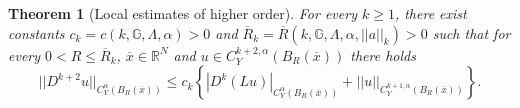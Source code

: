 \documentclass{article}
\newtheorem{theorem}{Theorem}[section]
\numberwithin{equation}{section}
\begin{document}


\vspace{2mm}

\begin{theorem}[Local estimates of higher order]
\label{local est high order der thm}
    For every $k \geq 1$, there exist constants $c_k=c(k,\mathbb{G}, \Lambda, \alpha)>0$ and $\overline{R}_k=\overline{R}(k,\mathbb{G}, \Lambda, \alpha, ||a||_k)>0$ such that for every $0 < R \leq \overline{R}_k$, $\overline{x} \in \mathbb{R}^N$ and $u \in C^{k+2,\alpha}_{Y}(B_R(\overline{x}))$ there holds
    \begin{equation*}
        ||D^{k+2}u||_{C^{\alpha}_Y(B_R(\overline{x}))} \leq c_k \left\{|D^k( Lu)|_{C^{\alpha}_Y(B_R(\overline{x}))} + ||u||_{C^{k+1,\alpha}_Y(B_R(\overline{x}))}\right\}.
    \end{equation*}
\end{theorem}

\vspace{2mm}
\end{document}
